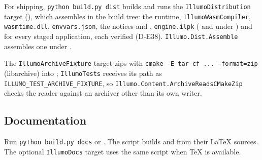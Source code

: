 For shipping, \texttt{python build.py dist} builds and runs the
\texttt{IllumoDistribution} target (),
which assembles  in the build tree: the runtime,
\texttt{IllumoWasmCompiler}, \texttt{wasmtime.dll}, \texttt{envvars.json}, the
notices and , \texttt{engine.ilpk} (
and  under )
and  for every staged application, each verified
(D-E38). \texttt{Illumo.Dist.Assemble} assembles one under
.

The \texttt{IllumoArchiveFixture} target zips
 with
\texttt{cmake -E tar cf ... --format=zip} (libarchive) into
; \texttt{IllumoTests} receives its path as
\texttt{ILLUMO\_TEST\_ARCHIVE\_FIXTURE}, so
\texttt{Illumo.Content.ArchiveReadsCMakeZip} checks the reader against an
archiver other than its own writer.

\subsection{Documentation}
Run \texttt{python build.py docs} or . The script builds
 and
 from their LaTeX sources. The
optional \texttt{IllumoDocs} target uses the same script when TeX is available.
